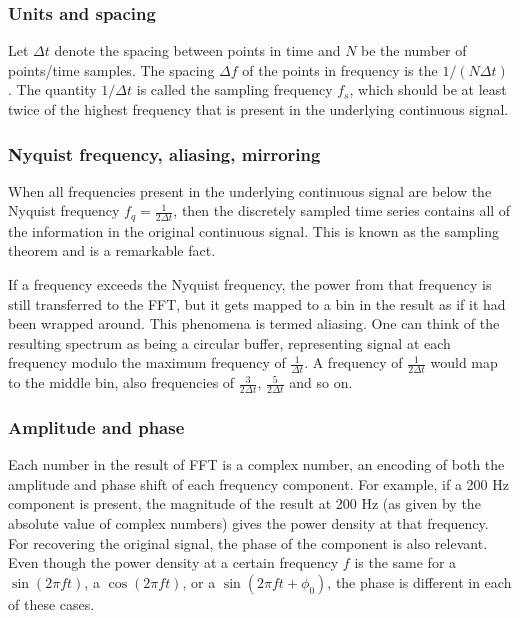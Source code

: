 \subsubsection{Units and spacing}

Let $\Delta t$ denote the spacing between points in time
and $N$ be the number of points/time samples.
The spacing $\Delta f$ of the points in frequency is the $1/(N\Delta t)$.
The quantity $1/\Delta t$ is called the sampling frequency $f_s$,
which should be at least twice of the highest frequency that is present in the
underlying continuous signal.

\subsubsection{Nyquist frequency, aliasing, mirroring}

When all frequencies present in the underlying continuous signal are below the
Nyquist frequency $f_q=\frac{1}{2\Delta t}$, then the discretely sampled time
series contains all of the information in the original continuous signal.
This is known as the sampling theorem and is a remarkable fact.

If a frequency exceeds the Nyquist frequency, the power from that frequency is
still transferred to the FFT, but it gets mapped to a bin in the result as if it
had been wrapped around. This phenomena is termed aliasing.
One can think of the resulting spectrum as being a circular buffer, representing
signal at each frequency modulo the maximum frequency of $\frac{1}{\Delta t}$.
A frequency of $\frac{1}{2\Delta t}$ would map to the middle bin,
also frequencies of $\frac{3}{2\Delta t}$, $\frac{5}{2\Delta t}$ and so on.

\subsubsection{Amplitude and phase}

Each number in the result of FFT is a complex number, an encoding of both the
amplitude and phase shift of each frequency component.
For example, if a 200 Hz component is present, the magnitude of the result at
200 Hz (as given by the absolute value of complex numbers) gives the power
density at that frequency.
For recovering the original signal, the phase of the component is also relevant.
Even though the power density at a certain frequency $f$ is the same for a
$\sin(2\pi ft)$, a $\cos(2\pi ft)$, or a $\sin(2\pi ft + \phi_0)$,
the phase is different in each of these cases.

